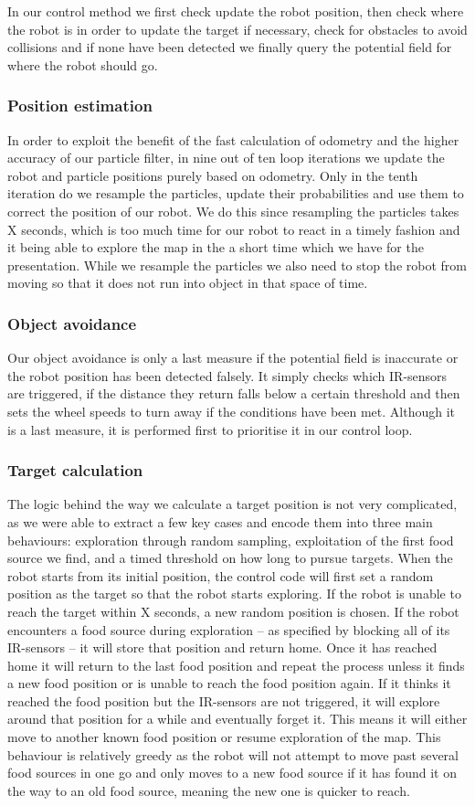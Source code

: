 \documentclass[paper=a4, fontsize=12pt]{scrartcl}	%
\numberwithin{equation}{section}		%
\numberwithin{figure}{section}			%
\numberwithin{table}{section}				%
\begin{document}
In our control method we first check update the robot position, then check where the robot is in order to update the target if necessary, check for obstacles to avoid collisions and if none have been detected we finally query the potential field for where the robot should go.
\subsubsection{Position estimation}
In order to exploit the benefit of the fast calculation of odometry and the higher accuracy of our particle filter, in nine out of ten loop iterations we update the robot and particle positions purely based on odometry. Only in the tenth iteration do we resample the particles, update their probabilities and use them to correct the position of our robot. We do this since resampling the particles takes X seconds, which is too much time for our robot to react in a timely fashion and it being able to explore the map in the a short time which we have for the presentation. While we resample the particles we also need to stop the robot from moving so that it does not run into object in that space of time.
\subsubsection{Object avoidance}
Our object avoidance is only a last measure if the potential field is inaccurate or the robot position has been detected falsely. It simply checks which IR-sensors are triggered, if the distance they return falls below a certain threshold and then sets the wheel speeds to turn away if the conditions have been met. Although it is a last measure, it is performed first to prioritise it in our control loop.
\subsubsection{Target calculation}
The logic behind the way we calculate a target position is not very complicated, as we were able to extract a few key cases and encode them into three main behaviours: exploration through random sampling, exploitation of the first food source we find, and a timed threshold on how long to pursue targets. When the robot starts from its initial position, the control code will first set a random position as the target so that the robot starts exploring. If the robot is unable to reach the target within X seconds, a new random position is chosen. If the robot encounters a food source during exploration – as specified by blocking all of its IR-sensors – it will store that position and return home. Once it has reached home it will return to the last food position and repeat the process unless it finds a new food position or is unable to reach the food position again. If it thinks it reached the food position but the IR-sensors are not triggered, it will explore around that position for a while and eventually forget it. This means it will either move to another known food position or resume exploration of the map. This behaviour is relatively greedy as the robot will not attempt to move past several food sources in one go and only moves to a new food source if it has found it on the way to an old food source, meaning the new one is quicker to reach.
\end{document}
